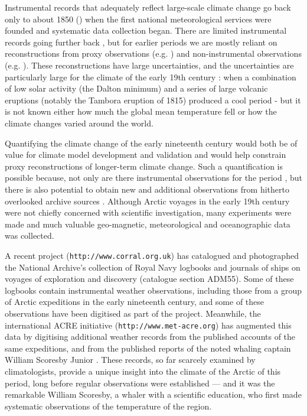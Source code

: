 \documentclass[CP]{copernicus}
\begin{document}
Instrumental records that adequately reflect large-scale climate change go back only to about 1850 (\citet{brohan06hadcrut3, allan06meansealevelpressure}) when the first national meteorological services were founded and systematic data collection began. There are limited instrumental records going further back \citep{jones03seas,parker92CET}, but for earlier periods we are mostly reliant on reconstructions from proxy observations (e.g. \citet{jones09millennium}) and non-instrumental observations (e.g. \citet{wheeler06cliwoc}). These reconstructions have large uncertainties, and the uncertainties are particularly large for the climate of the early 19th century \citep{jansen07ipcc}: when a combination of low solar activity (the Dalton minimum) and a series of large volcanic eruptions (notably the Tambora eruption of 1815) produced a cool period - but it is not known either how much the global mean temperature fell or how the climate changes varied around the world.

Quantifying the climate change of the early nineteenth century would both be of value for climate model development and validation \citep{wagner05dalton} and would help constrain proxy reconstructions of longer-term climate change. Such a quantification is possible because, not only are there instrumental observations for the period \citep{chenoweth01,harrington_1992}, but there is also potential to obtain new and additional observations from hitherto overlooked archive sources \citep{brohan09digitisation}. Although Arctic voyages in the early 19th century were not chiefly concerned with scientific investigation, many experiments were made and much valuable geo-magnetic, meteorological and oceanographic data was collected. 

A recent project ({\tt http://www.corral.org.uk}) has catalogued and photographed the National Archive's collection of Royal Navy logbooks and journals of ships on voyages of exploration and discovery (catalogue section ADM55). Some of these logbooks contain instrumental weather observations, including those from a group of Arctic expeditions in the early nineteenth century, and some of these observations have been digitised as part of the project. Meanwhile, the international ACRE initiative ({\tt http://www.met-acre.org}) has augmented this data by digitising additional weather records from the published accounts of the same expeditions, and from the published reports of the noted whaling captain William Scoresby Junior \citep{jackson_2003}. These records, so far scarcely examined by climatologists, provide a unique insight into the climate of the Arctic of this period, long before regular observations were established --- and it was the remarkable William Scoresby, a whaler with a scientific education, who first made systematic observations of the temperature of the region.
\end{document}
